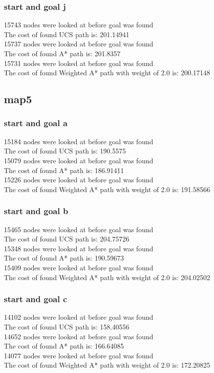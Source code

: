 \documentclass[11pt]{article} %
\begin{document}
\subsubsection{start and goal j}
15743 nodes were looked at before goal was found\\
The cost of found UCS path is: 201.14941\\
15737 nodes were looked at before goal was found\\
The cost of found A* path is: 201.8357\\
15731 nodes were looked at before goal was found\\
The cost of found Weighted A* path with weight of 2.0 is: 200.17148\\

\subsection{map5}
\subsubsection{start and goal a}
15184 nodes were looked at before goal was found\\
The cost of found UCS path is: 190.5575\\
15079 nodes were looked at before goal was found\\
The cost of found A* path is: 186.91411\\
15226 nodes were looked at before goal was found\\
The cost of found Weighted A* path with weight of 2.0 is: 191.58566\\
\subsubsection{start and goal b}
15465 nodes were looked at before goal was found\\
The cost of found UCS path is: 204.75726\\
15348 nodes were looked at before goal was found\\
The cost of found A* path is: 190.59673\\
15409 nodes were looked at before goal was found\\
The cost of found Weighted A* path with weight of 2.0 is: 204.02502\\
\subsubsection{start and goal c}
14102 nodes were looked at before goal was found\\
The cost of found UCS path is: 158.40556\\
14652 nodes were looked at before goal was found\\
The cost of found A* path is: 166.64085\\
14077 nodes were looked at before goal was found\\
The cost of found Weighted A* path with weight of 2.0 is: 172.20825\\
\end{document}
